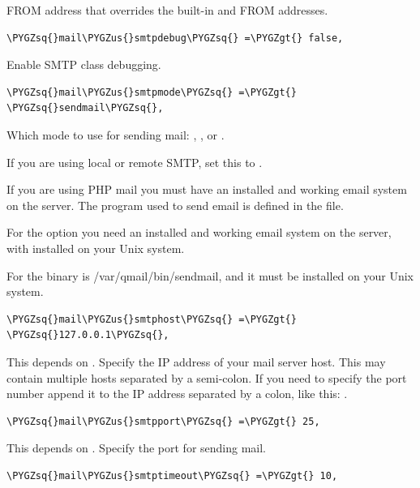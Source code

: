 \documentclass[letterpaper,10pt,english]{sphinxmanual}
\def\PYGZus{\char`\_}
\def\PYGZgt{\char`\>}
\def\PYGZsq{\char`\'}
\begin{document}
FROM address that overrides the built-in  and
 FROM addresses.

\begin{Verbatim}[commandchars=\\\{\}]
\PYGZsq{}mail\PYGZus{}smtpdebug\PYGZsq{} =\PYGZgt{} false,
\end{Verbatim}

Enable SMTP class debugging.

\begin{Verbatim}[commandchars=\\\{\}]
\PYGZsq{}mail\PYGZus{}smtpmode\PYGZsq{} =\PYGZgt{} \PYGZsq{}sendmail\PYGZsq{},
\end{Verbatim}

Which mode to use for sending mail: , ,  or
.

If you are using local or remote SMTP, set this to .

If you are using PHP mail you must have an installed and working email system
on the server. The program used to send email is defined in the 
file.

For the  option you need an installed and working email system on
the server, with  installed on your Unix system.

For  the binary is /var/qmail/bin/sendmail, and it must be installed
on your Unix system.

\begin{Verbatim}[commandchars=\\\{\}]
\PYGZsq{}mail\PYGZus{}smtphost\PYGZsq{} =\PYGZgt{} \PYGZsq{}127.0.0.1\PYGZsq{},
\end{Verbatim}

This depends on . Specify the IP address of your mail
server host. This may contain multiple hosts separated by a semi-colon. If
you need to specify the port number append it to the IP address separated by
a colon, like this: .

\begin{Verbatim}[commandchars=\\\{\}]
\PYGZsq{}mail\PYGZus{}smtpport\PYGZsq{} =\PYGZgt{} 25,
\end{Verbatim}

This depends on . Specify the port for sending mail.

\begin{Verbatim}[commandchars=\\\{\}]
\PYGZsq{}mail\PYGZus{}smtptimeout\PYGZsq{} =\PYGZgt{} 10,
\end{Verbatim}
\end{document}
